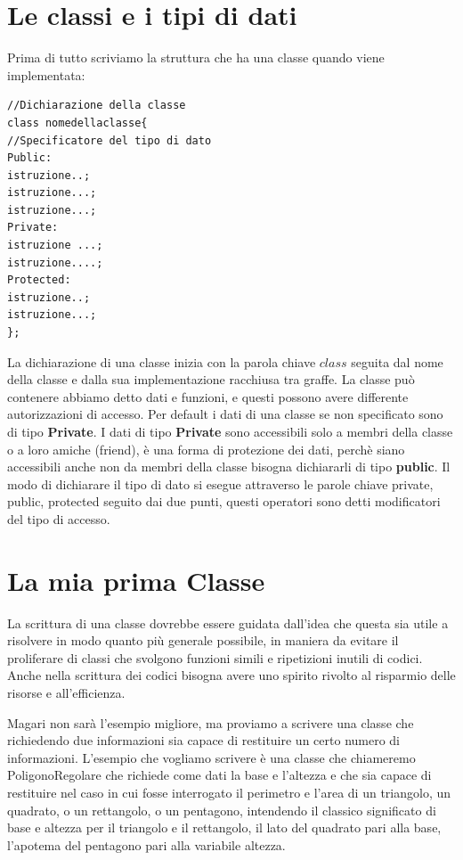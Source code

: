 \documentclass[11pt,fleqn]{book} %
\begin{document}
\section{Le classi e i tipi di dati}

Prima di tutto scriviamo la struttura che ha una classe quando viene implementata:

\begin{verbatim}
//Dichiarazione della classe
class nomedellaclasse{
//Specificatore del tipo di dato
Public:
istruzione..;
istruzione...;
istruzione...;
Private:
istruzione ...;
istruzione....;
Protected:
istruzione..;
istruzione...;
};
\end{verbatim}

La dichiarazione di una classe inizia con la parola chiave $class$ seguita
dal nome della classe e dalla sua implementazione racchiusa tra graffe.
La classe può contenere abbiamo detto dati e funzioni, e questi possono avere differente autorizzazioni di accesso.
Per default i dati di una classe se non specificato sono di tipo \textbf{Private}.
I dati di tipo \textbf{Private} sono accessibili solo a membri della classe o a loro amiche (friend), è una forma di protezione dei dati, perchè siano accessibili anche non da membri della classe bisogna dichiararli di tipo \textbf{public}. Il modo di dichiarare il tipo di dato si esegue attraverso le parole chiave private, public, protected seguito dai due punti, questi operatori sono detti modificatori del tipo di accesso.


\section{La mia prima Classe}

La scrittura di una classe dovrebbe essere guidata dall'idea che questa sia utile a risolvere in modo quanto più generale possibile, in maniera da evitare il proliferare di classi che svolgono funzioni simili e ripetizioni inutili di codici. Anche nella scrittura dei codici bisogna avere uno spirito rivolto al risparmio delle risorse e all'efficienza.

Magari non sarà l'esempio migliore, ma proviamo a scrivere una classe che richiedendo due informazioni sia capace di restituire un certo numero di informazioni. L'esempio che vogliamo scrivere è una classe che chiameremo PoligonoRegolare che richiede come dati la base e l'altezza e che sia capace di restituire nel caso in cui fosse interrogato il perimetro e l'area di un triangolo, un quadrato, o un rettangolo, o un pentagono, intendendo il classico significato di base e altezza per il triangolo e il rettangolo, il lato del quadrato pari alla base, l'apotema del pentagono pari alla variabile altezza.
\end{document}
